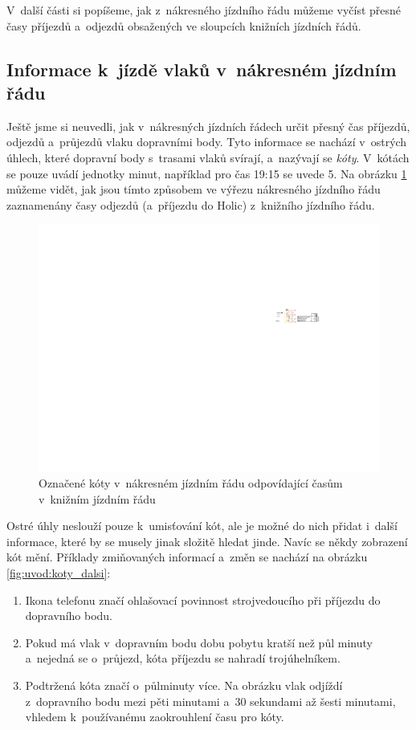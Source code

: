 V~další části si popíšeme, jak z~nákresného jízdního řádu můžeme vyčíst přesné časy příjezdů a~odjezdů obsažených ve sloupcích knižních jízdních řádů.

\subsection*{Informace k~jízdě vlaků v~nákresném jízdním řádu}
\label{kap1:koty_a_informace_o_prubehu_vlaku}
Ještě jsme si neuvedli, jak v~nákresných jízdních řádech určit přesný čas příjezdů, odjezdů a~průjezdů vlaku dopravními body. Tyto informace se nachází v~ostrých úhlech, které dopravní body s~trasami vlaků svírají, a~nazývají se \textit{kóty}. V~kótách se pouze uvádí jednotky minut, například pro čas 19:15 se uvede 5. Na obrázku \ref{fig:uvod:koty} můžeme vidět, jak jsou tímto způsobem ve výřezu nákresného jízdního řádu zaznamenány časy odjezdů (a~příjezdu do Holic) z~knižního jízdního řádu.

\begin{figure}[ht]
	\centering
	\includegraphics[width=\textwidth]{../img/kap1_koty_popis}
	\caption{Označené kóty v~nákresném jízdním řádu odpovídající časům v~knižním jízdním řádu}
	\label{fig:uvod:koty}
\end{figure}

Ostré úhly neslouží pouze k~umisťování kót, ale je možné do nich přidat i~další informace, které by se musely jinak složitě hledat jinde. Navíc se někdy zobrazení kót mění. Příklady zmiňovaných informací a~změn se nachází na obrázku \ref{fig:uvod:koty_dalsi}:

\begin{enumerate}[label=(\alph*)]
\item Ikona telefonu značí ohlašovací povinnost strojvedoucího při příjezdu do dopravního bodu.
\item Pokud má vlak v~dopravním bodu dobu pobytu kratší než půl minuty a~nejedná se o~průjezd, kóta příjezdu se nahradí trojúhelníkem.
\item Podtržená kóta značí o~půlminuty více. Na obrázku vlak odjíždí z~dopravního bodu mezi pěti minutami a~30 sekundami až šesti minutami, vhledem k~používanému zaokrouhlení času pro kóty.
\end{enumerate}

